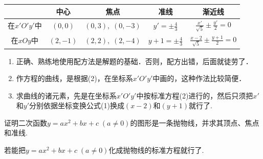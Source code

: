 \begin{center}
\begin{tabular}{c|cccc}
\hline
& 中心 & 焦点& 准线 & 渐近线\\
\hline
在$x'O'y'$中 &  $(0,0)$ &  $\left(0,3\right),\; (0,-3)$ &  $y'=\pm\frac{4}{3}$& $\frac{x'}{\sqrt{5}}\pm\frac{y'}{2}=0$\\
在$xOy$中 &  $\left(2,-1\right)$ &  $\left(2,2\right),\; (2,-4)$ &  $y+1=\pm\frac{4}{3}$& $\frac{x-2}{\sqrt{5}}\pm\frac{y+1}{2}=0$\\
\hline
\end{tabular}
\end{center}



\begin{remark}
\begin{enumerate}
    \item 正确、熟练地使用配方法是解题的基础．否则，配方出错，后面就徒劳了．
    \item 作方程的曲线，是根据(2)，在坐标系$x'O'y'$中画的，这种作法比较简便．
    \item 求曲线的诸元素，先是在坐标系$x'O'y'$中按标准方程(2)进行的，然后只须把$x'$和$y'$分别依据坐标变换公式(1)换成$(x-2)$和$(y+1)$就行了.
\end{enumerate}
\end{remark}

\begin{example}
    证明二次函数$y=ax^2+bx+c\; (a\ne 0)$的图形是一条抛物线，并求其顶点、焦点和准线.
\end{example}

\begin{analyze}
     若能把$y=ax^2+bx+c\; (a\ne 0)$化成抛物线的标准方程就行了.
\end{analyze}

